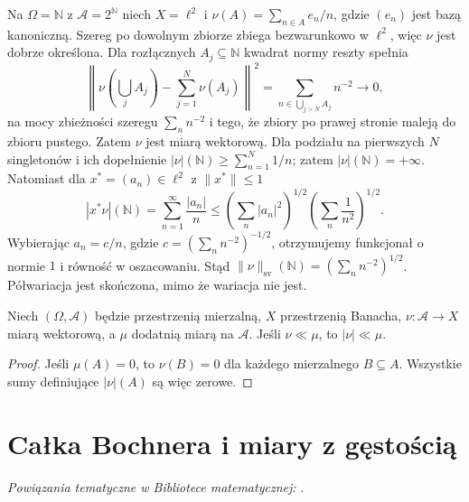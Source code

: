 \begin{przyklad}
\label{ex:semivariation-not-variation-30}
Na $\Omega=\mathbb N$ z $\mathcal A=2^{\mathbb N}$
niech $X=\ell^2$ i $\nu(A)=\sum_{n\in A}e_n/n$,
gdzie $(e_n)$ jest bazą kanoniczną. Szereg po dowolnym
zbiorze zbiega bezwarunkowo w $\ell^2$, więc $\nu$ jest dobrze określona. Dla rozłącznych
$A_j\subseteq\mathbb N$ kwadrat normy reszty spełnia
\[
 \left\|\nu\left(\bigcup_j A_j\right)
 -\sum_{j=1}^N\nu(A_j)\right\|^2
 =\sum_{n\in\bigcup_{j>N}A_j}n^{-2}\longrightarrow0,
\]
na mocy zbieżności szeregu $\sum_n n^{-2}$ i tego,
że zbiory po prawej stronie maleją do zbioru pustego.
Zatem $\nu$ jest miarą wektorową. Dla podziału na
pierwszych $N$ singletonów i ich dopełnienie
$|\nu|(\mathbb N)\ge\sum_{n=1}^{N}1/n$; zatem
$|\nu|(\mathbb N)=+\infty$.
Natomiast dla $x^*=(a_n)\in\ell^2$ z $\|x^*\|\le1$
\[
 |x^*\nu|(\mathbb N)=\sum_{n=1}^{\infty}\frac{|a_n|}{n}
 \le\left(\sum_n|a_n|^2\right)^{1/2}
 \left(\sum_n\frac1{n^2}\right)^{1/2}.
\]
Wybierając $a_n=c/n$, gdzie
$c=(\sum_n n^{-2})^{-1/2}$, otrzymujemy funkcjonał
o normie $1$ i równość w oszacowaniu.
Stąd $\|\nu\|_{\mathrm{sv}}(\mathbb N)
=(\sum_n n^{-2})^{1/2}$.
Półwariacja jest skończona, mimo że wariacja nie jest.
\end{przyklad}

\begin{lemat}
\label{lem:vector-variation-ac-30}
Niech $(\Omega,\mathcal A)$ będzie przestrzenią
mierzalną, $X$ przestrzenią Banacha, $\nu:\mathcal A\to X$
miarą wektorową, a $\mu$ dodatnią miarą na $\mathcal A$.
Jeśli $\nu\ll\mu$, to $|\nu|\ll\mu$.
\end{lemat}
\begin{proof}
Jeśli $\mu(A)=0$, to $\nu(B)=0$ dla każdego
mierzalnego $B\subseteq A$. Wszystkie sumy definiujące
$|\nu|(A)$ są więc zerowe.
\end{proof}

\section{Całka Bochnera i miary z gęstością}
\label{sec:bochner-30}

\noindent\emph{Powiązania tematyczne w Bibliotece matematycznej:} .

